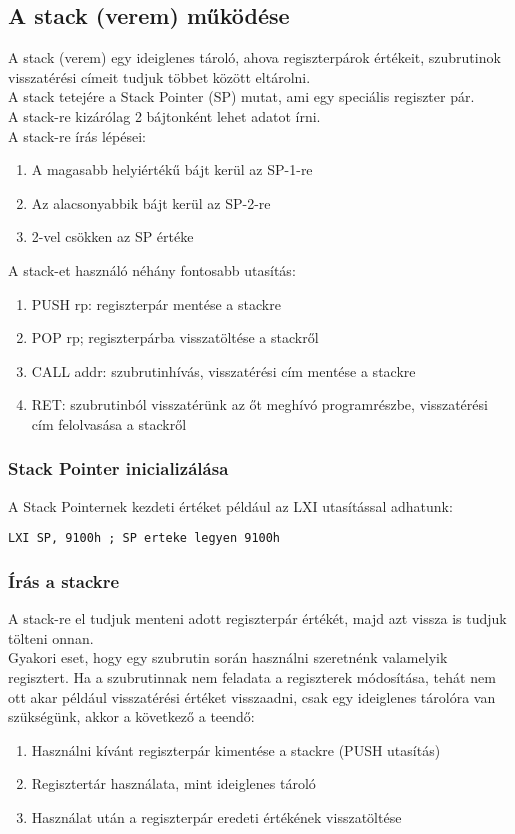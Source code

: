 \subsection{A stack (verem) működése}
A stack (verem) egy ideiglenes tároló, ahova regiszterpárok értékeit, szubrutinok visszatérési címeit tudjuk többet között eltárolni. \\
A stack tetejére a Stack Pointer (SP) mutat, ami egy speciális regiszter pár. \\
A stack-re kizárólag 2 bájtonként lehet adatot írni. \\
A stack-re írás lépései:
\begin{enumerate}
  \item A magasabb helyiértékű bájt kerül az SP-1-re
  \item Az alacsonyabbik bájt kerül az SP-2-re
  \item 2-vel csökken az SP értéke
\end{enumerate}
A stack-et használó néhány fontosabb utasítás:
\begin{enumerate}
  \item PUSH rp: regiszterpár mentése a stackre
  \item POP rp; regiszterpárba visszatöltése a stackről
  \item CALL addr: szubrutinhívás, visszatérési cím mentése a stackre
  \item RET: szubrutinból visszatérünk az őt meghívó programrészbe, visszatérési cím felolvasása a stackről
\end{enumerate}
\subsubsection{Stack Pointer inicializálása}
A Stack Pointernek kezdeti értéket például az LXI utasítással adhatunk:
\begin{lstlisting}[frame=single]
LXI SP, 9100h ; SP erteke legyen 9100h
\end{lstlisting}
\subsubsection{Írás a stackre}
A stack-re el tudjuk menteni adott regiszterpár értékét, majd azt vissza is tudjuk tölteni onnan. \\
Gyakori eset, hogy egy szubrutin során használni szeretnénk valamelyik regisztert. Ha a szubrutinnak nem feladata a regiszterek módosítása, tehát nem ott akar például visszatérési értéket visszaadni, csak egy ideiglenes tárolóra van szükségünk, akkor a következő a teendő:
\begin{enumerate}
  \item Használni kívánt regiszterpár kimentése a stackre (PUSH utasítás)
  \item Regisztertár használata, mint ideiglenes tároló
  \item Használat után a regiszterpár eredeti értékének visszatöltése
\end{enumerate}

